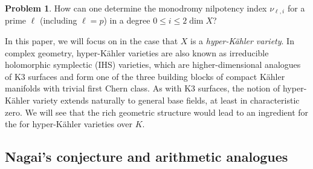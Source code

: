 \documentclass[12pt,reqno]{amsart}
\theoremstyle{definition}
\newtheorem{prob}[thm]{Problem}
\numberwithin{equation}{section}
\begin{document}
\begin{prob}\label{Motivation}
How can one determine the monodromy nilpotency index $\nu_{\ell,i}$ for a prime $\ell$ (including $\ell = p$) in a degree $0 \leq i \leq 2 \dim X$?  
\end{prob}

In this paper, we will focus on  in the case that $X$ is a \emph{hyper-Kähler variety}. In complex geometry, hyper-Kähler varieties are also known as irreducible holomorphic symplectic (IHS) varieties, which are higher-dimensional analogues of K3 surfaces and form one of the three building blocks of compact Kähler manifolds with trivial first Chern class.
As with K3 surfaces, the notion of hyper-Kähler variety extends naturally to general base fields, at least in characteristic zero. 
We will see that the rich geometric structure would lead to an ingredient for the  for hyper-Kähler varieties over $K$. 


\subsection{Nagai's conjecture and arithmetic analogues}
\end{document}
